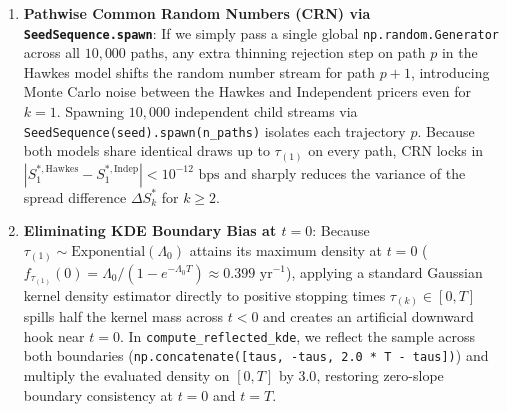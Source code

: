 \documentclass[11pt,a4paper]{article}
\begin{document}
\begin{enumerate}
  \item \textbf{Pathwise Common Random Numbers (CRN) via \texttt{SeedSequence.spawn}}: If we simply pass a single global \texttt{np.random.Generator} across all $10,000$ paths, any extra thinning rejection step on path $p$ in the Hawkes model shifts the random number stream for path $p+1$, introducing Monte Carlo noise between the Hawkes and Independent pricers even for $k=1$. Spawning $10,000$ independent child streams via \texttt{SeedSequence(seed).spawn(n\_paths)} isolates each trajectory $p$. Because both models share identical draws up to $\tau_{(1)}$ on every path, CRN locks in $|S_1^{*,\text{Hawkes}} - S_1^{*,\text{Indep}}| < 10^{-12}\text{ bps}$ and sharply reduces the variance of the spread difference $\Delta S_k^*$ for $k \ge 2$.
  \item \textbf{Eliminating KDE Boundary Bias at $t = 0$}: Because $\tau_{(1)} \sim \mathrm{Exponential}(\Lambda_0)$ attains its maximum density at $t = 0$ ($f_{\tau_{(1)}}(0) = \Lambda_0 / (1 - e^{-\Lambda_0 T}) \approx 0.399\text{ yr}^{-1}$), applying a standard Gaussian kernel density estimator directly to positive stopping times $\tau_{(k)} \in [0, T]$ spills half the kernel mass across $t < 0$ and creates an artificial downward hook near $t = 0$. In \texttt{compute\_reflected\_kde}, we reflect the sample across both boundaries (\texttt{np.concatenate([taus, -taus, 2.0 * T - taus])}) and multiply the evaluated density on $[0, T]$ by $3.0$, restoring zero-slope boundary consistency at $t = 0$ and $t = T$.
\end{enumerate}
\end{document}
